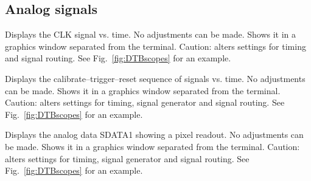 \subsection{Analog signals}
\begin{description}

    Displays the CLK signal vs. time. No adjustments can be made. Shows it in a graphics window separated from the terminal. Caution: alters settings for timing and signal routing. See Fig.~\ref{fig:DTBscopes} for an example.

    Displays the calibrate--trigger--reset sequence of signals vs. time. No adjustments can be made. Shows it in a graphics window separated from the terminal. Caution: alters settings for timing, signal generator and signal routing. See Fig.~\ref{fig:DTBscopes} for an example.

    Displays the analog data SDATA1 showing a pixel readout. No adjustments can be made. Shows it in a graphics window separated from the terminal. Caution: alters settings for timing, signal generator and signal routing. See Fig.~\ref{fig:DTBscopes} for an example.
\end{description}

